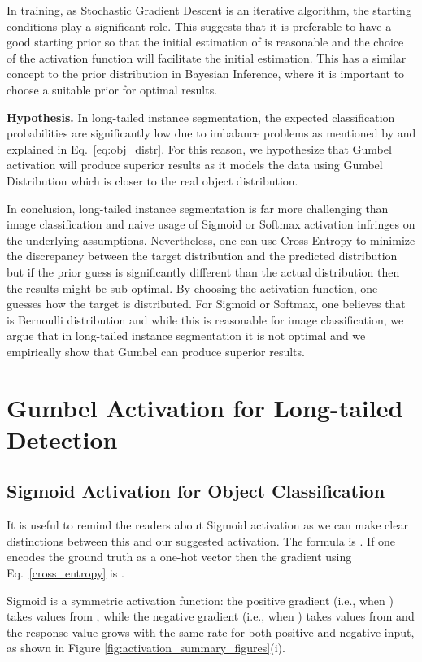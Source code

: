 \documentclass[runningheads]{llncs}
\begin{document}
In training, as Stochastic Gradient Descent is an iterative algorithm, the starting conditions play a significant role. This suggests that it is preferable to have a good starting prior so that the initial estimation of  is reasonable and the choice of the activation function will facilitate the initial estimation. This has a similar concept to the prior distribution in Bayesian Inference, where it is important to choose a suitable prior for optimal results. 



\noindent\textbf{Hypothesis.} In long-tailed instance segmentation, the expected classification probabilities are significantly low due to imbalance problems as mentioned by \cite{oksuz2020imbalance} and explained in Eq.~\ref{eq:obj_distr}. For this reason, we hypothesize that Gumbel activation will produce superior results as it models the data using Gumbel Distribution which is closer to the real object distribution.

In conclusion, long-tailed instance segmentation is far more challenging than image classification and naive usage of Sigmoid or Softmax activation infringes on the underlying assumptions. 
Nevertheless, one can use Cross Entropy  to minimize the discrepancy between the target distribution  and the predicted distribution 
but if the prior guess is significantly different than the actual distribution  then the results might be sub-optimal. By choosing the activation function, one guesses how the target  is distributed. For Sigmoid or Softmax, one believes that  is Bernoulli distribution and while this is reasonable for image classification, we argue that in long-tailed instance segmentation it is not optimal and we empirically show that Gumbel can produce superior results.
\section{Gumbel Activation for Long-tailed Detection}
\label{sec:methodology}

\subsection{Sigmoid Activation for Object Classification}
It is useful to remind the readers about Sigmoid activation as we can make clear distinctions between this and our suggested activation. The formula is  .
If one encodes the ground truth  as a one-hot vector then the gradient using Eq.~\ref{cross_entropy} is .

Sigmoid is a symmetric activation function: the positive gradient (i.e.,  when ) takes values from , while the negative gradient (i.e.,  when ) takes values from  and the response value grows with the same rate for both positive and negative input, as shown in Figure \ref{fig:activation_summary_figures}(i).
\end{document}
